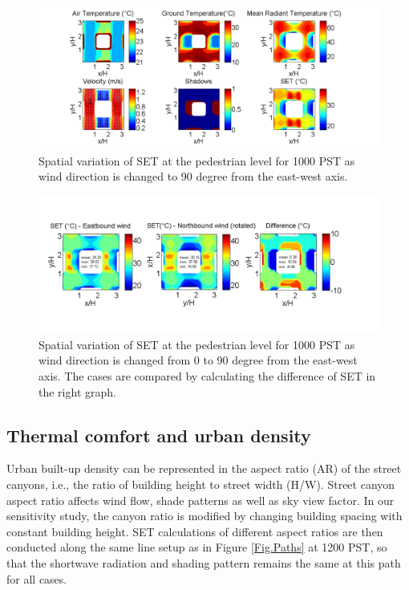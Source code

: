 \documentclass[smallextended]{svjour3}
\begin{document}
\begin{figure}[!h]
\graphicspath{ {image/} }
\centerline{\includegraphics[width=\textwidth]{Theta90_10AM.png}}    
\caption{Spatial variation of SET at the pedestrian level for 1000 PST as wind direction is changed to 90 degree from the east-west axis.}  
\label{Fig.Swind}
\end{figure}

\begin{figure}[!h]
\graphicspath{ {image/} }
\centerline{\includegraphics[trim= 0 1.8cm 2cm 1.7cm,clip=true, width=\textwidth]{compare_winds.png}}    
\caption{Spatial variation of SET at the pedestrian level for 1000 PST as wind direction is changed from 0 to 90 degree from the east-west axis. The cases are compared by calculating the difference of SET in the right graph. }  
\label{Fig.SwindComp}
\end{figure}

\subsection{Thermal comfort and urban density}
Urban built-up density can be represented in the aspect ratio (AR) of the street canyons, i.e., the ratio of building height to street width (H/W). Street canyon aspect ratio affects wind flow, shade patterns as well as sky view factor. In our sensitivity study, the canyon ratio is modified by changing building spacing with constant building height. SET calculations of different aspect ratios are then conducted along the same line setup as in Figure \ref{Fig.Paths} at 1200 PST, so that the shortwave radiation and shading pattern remains the same at this path for all cases. 
\end{document}
